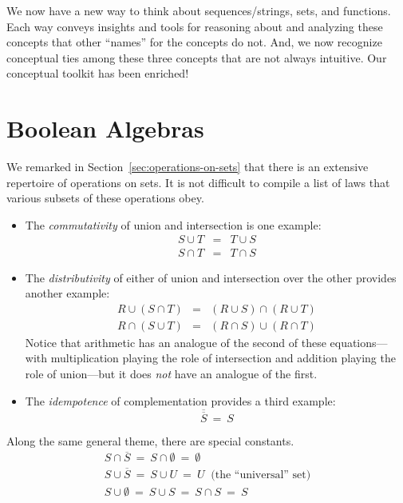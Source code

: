 We now have a new way to think about sequences/strings, sets, and
functions.  Each way conveys insights and tools for reasoning about
and analyzing these concepts that other ``names'' for the concepts do
not.  And, we now recognize conceptual ties among these three concepts
that are not always intuitive.  Our conceptual toolkit has been
enriched!

\section{Boolean Algebras}
\label{sec:Boolean-Algebra}

We remarked in Section~\ref{sec:operations-on-sets} that there is an
extensive repertoire of operations on sets.  It is not difficult to
compile a list of laws that various subsets of these operations obey.
\begin{itemize}
\item
The {\em commutativity} of union and intersection is one example:
\begin{eqnarray*}
S \cup T & = & T \cup S \\
S \cap T & = & T \cap S
\end{eqnarray*}

\item
The {\em distributivity} of either of union and intersection over the
other provides another example:
\begin{eqnarray*}
R \cup (S \cap T) & = & (R \cup S) \cap (R \cup T) \\
R \cap (S \cup T) & = & (R \cap S) \cup (R \cap T)
\end{eqnarray*}
Notice that arithmetic has an analogue of the second of these
equations---with multiplication playing the role of intersection and
addition playing the role of union---but it does {\em not} have an
analogue of the first.

\item
The {\em idempotence} of complementation provides a third example:
\[ \overline{\overline{S}} \ = \ S \]
\end{itemize}
Along the same general theme, there are special constants.
\[
\begin{array}{l}
S \cap \overline{S} \ = \ S \cap \emptyset \ = \ \emptyset \\
S \cup \overline{S} \ = \ S \cup U \ = \ U \ \mbox{ (the ``universal'' set)} \\
S \cup \emptyset \ = \ S \cup S \ = \ S \cap S \ = \ S \\
\end{array}
\]

